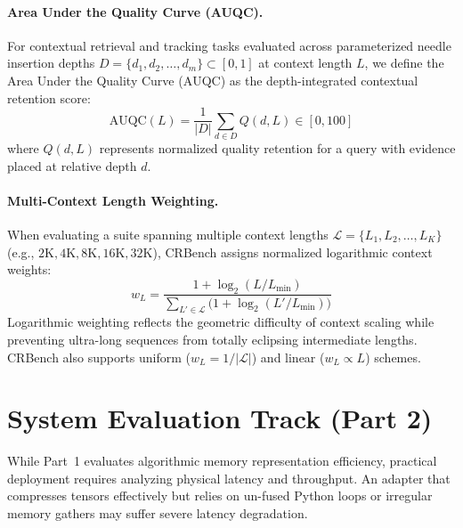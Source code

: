 \documentclass[11pt,a4paper]{article}
\begin{document}
\paragraph{Area Under the Quality Curve (AUQC).} For contextual retrieval and tracking tasks evaluated across parameterized needle insertion depths $D = \{d_1, d_2, \dots, d_m\} \subset [0, 1]$ at context length $L$, we define the Area Under the Quality Curve ($\text{AUQC}$) as the depth-integrated contextual retention score:
\begin{equation}
\label{eq:auqc_def}
\boxed{
\text{AUQC}(L) = \frac{1}{|D|} \sum_{d \in D} Q(d, L) \in [0, 100]
}
\end{equation}
where $Q(d, L)$ represents normalized quality retention for a query with evidence placed at relative depth $d$.

\paragraph{Multi-Context Length Weighting.} When evaluating a suite spanning multiple context lengths $\mathcal{L} = \{L_1, L_2, \dots, L_K\}$ (e.g., $2\text{K}, 4\text{K}, 8\text{K}, 16\text{K}, 32\text{K}$), CRBench assigns normalized logarithmic context weights:
\begin{equation}
\label{eq:context_weighting}
\boxed{
w_L = \frac{1 + \log_2(L / L_{\min})}{\sum_{L' \in \mathcal{L}} \big(1 + \log_2(L' / L_{\min})\big)}
}
\end{equation}
Logarithmic weighting reflects the geometric difficulty of context scaling while preventing ultra-long sequences from totally eclipsing intermediate lengths. CRBench also supports uniform ($w_L = 1/|\mathcal{L}|$) and linear ($w_L \propto L$) schemes.

\section{System Evaluation Track (Part 2)}
\label{sec:system_track}

While Part~1 evaluates algorithmic memory representation efficiency, practical deployment requires analyzing physical latency and throughput. An adapter that compresses tensors effectively but relies on un-fused Python loops or irregular memory gathers may suffer severe latency degradation. 
\end{document}
